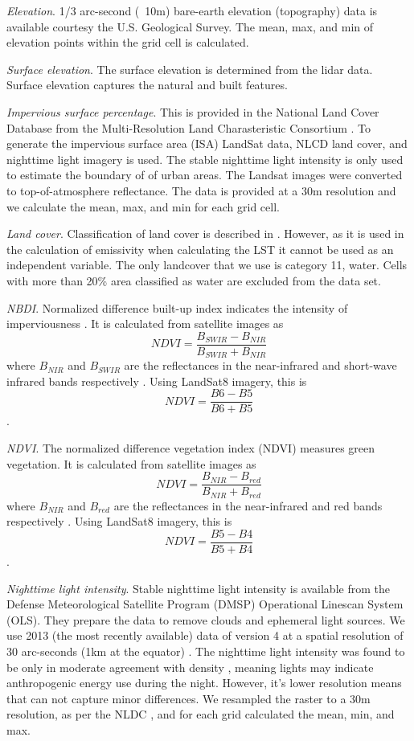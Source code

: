 \documentclass[]{elsarticle}
\begin{document}
\textit{Elevation}. 1/3 arc-second (~10m) bare-earth elevation (topography) data is available courtesy the U.S. Geological Survey. The mean, max, and min of elevation points within the grid cell is calculated.

\textit{Surface elevation}. The surface elevation is determined from the lidar data. Surface elevation captures the natural and built features. 

\textit{Impervious surface percentage}. This is provided in the National Land Cover Database from the Multi-Resolution Land Charasteristic Consortium \cite{Xian2011-aa}. To generate the impervious surface area (ISA) LandSat data, NLCD land cover, and nighttime light imagery is used. The stable nighttime light intensity is only used to estimate the boundary of of urban areas. The Landsat images were converted to top-of-atmosphere reflectance. The data is provided at a 30m resolution and we calculate the mean, max, and min for each grid cell.

\textit{Land cover}. Classification of land cover is described in \cite{Homer2015-ce}. However, as it is used in the calculation of emissivity when calculating the LST it cannot be used as an independent variable. The only landcover that we use is category 11, water. Cells with more than 20\% area classified as water are excluded from the data set.

\textit{NBDI}. Normalized difference built-up index indicates the intensity of imperviousness \cite{Bhatti2014-ae}. It is calculated from satellite images as $$NDVI=\frac{B_{SWIR}-B_{NIR}}{B_{SWIR}+B_{NIR}}$$ where $B_{NIR}$ and $B_{SWIR}$ are the reflectances in the near-infrared and short-wave infrared bands respectively \cite{Alhawiti2016-wv}. Using LandSat8 imagery, this is $$NDVI=\frac{B6-B5}{B6+B5}$$ \cite{barsi2014}.

\textit{NDVI}. The normalized difference vegetation index (NDVI) measures green vegetation. It is calculated from satellite images as $$NDVI=\frac{B_{NIR}-B_{red}}{B_{NIR}+B_{red}}$$ where $B_{NIR}$ and $B_{red}$ are the reflectances in the near-infrared and red bands respectively \cite{Alhawiti2016-wv}. Using LandSat8 imagery, this is $$NDVI=\frac{B5-B4}{B5+B4}$$ \cite{barsi2014}.

\textit{Nighttime light intensity}. Stable nighttime light intensity is available from the Defense Meteorological Satellite Program (DMSP) Operational Linescan System (OLS). They prepare the data to remove clouds and ephemeral light sources. We use 2013 (the most recently available) data of version 4 at a spatial resolution of 30 arc-seconds (1km at the equator) \cite{ngdc2013version}. The nighttime light intensity was found to be only in moderate agreement with density \cite{bagan2018}, meaning lights may indicate anthropogenic energy use during the night. However, it's lower resolution means that can not capture minor differences. We resampled the raster to a 30m resolution, as per the NLDC \cite{Homer2015-ce}, and for each grid calculated the mean, min, and max.
\end{document}
